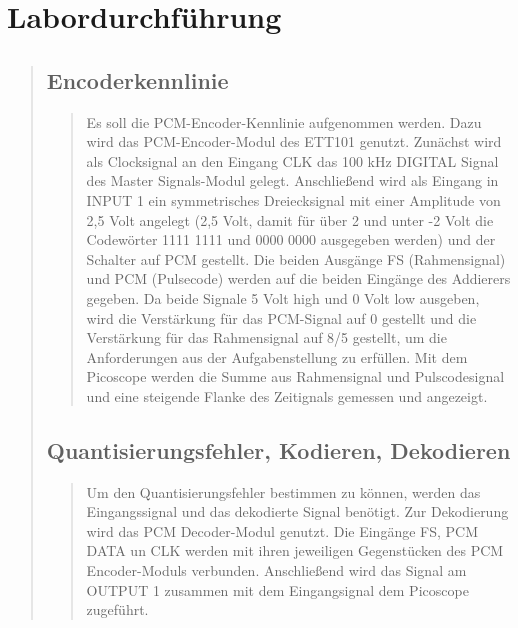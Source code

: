\section{Labordurchführung}
\begin{quote}
    
    
    \subsection{Encoderkennlinie}
    \begin{quote}
        
        Es soll die PCM-Encoder-Kennlinie aufgenommen werden.
        Dazu wird das PCM-Encoder-Modul des ETT101 genutzt. Zunächst wird als Clocksignal an den Eingang CLK das
        100 kHz DIGITAL Signal des Master Signals-Modul gelegt. Anschließend wird als Eingang in INPUT 1 ein
        symmetrisches Dreiecksignal mit einer Amplitude von 2,5 Volt angelegt (2,5 Volt, damit für über 2 und unter -2 Volt
        die Codewörter 1111 1111 und 0000 0000 ausgegeben werden) und der Schalter auf PCM gestellt.
        Die beiden Ausgänge FS (Rahmensignal) und PCM (Pulsecode) werden auf die beiden Eingänge des Addierers gegeben. Da
        beide Signale 5 Volt high und 0 Volt low ausgeben, wird die Verstärkung für das PCM-Signal auf 0 gestellt und die
        Verstärkung für das Rahmensignal auf 8/5 gestellt, um die Anforderungen aus der Aufgabenstellung zu erfüllen.
        Mit dem Picoscope werden die Summe aus Rahmensignal und Pulscodesignal und eine steigende Flanke des Zeitignals
        gemessen und angezeigt.
        
        
    \end{quote}
    
    \subsection{Quantisierungsfehler, Kodieren, Dekodieren}
    
    \begin{quote}
        
        Um den Quantisierungsfehler bestimmen zu können, werden das Eingangssignal und das dekodierte Signal benötigt. Zur
        Dekodierung wird das PCM Decoder-Modul genutzt. Die Eingänge FS, PCM DATA un CLK werden mit ihren jeweiligen
        Gegenstücken des PCM Encoder-Moduls verbunden. Anschließend wird das Signal am OUTPUT 1 zusammen mit dem
        Eingangsignal dem Picoscope zugeführt.\\
        
        
        
        
        
    \end{quote}
    
    
    
    
\end{quote}

